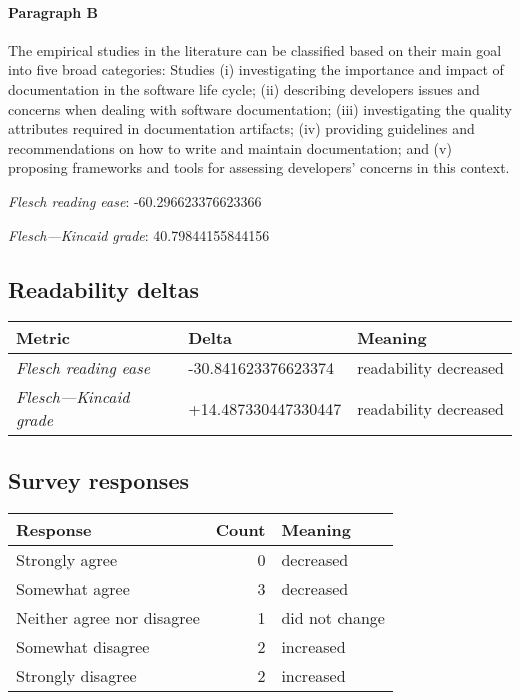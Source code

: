 \paragraph{Paragraph B}
The empirical studies in the literature can be classified based on their main goal into five broad categories: Studies (i) investigating the importance and impact of documentation in the software life cycle; (ii) describing developers issues and concerns when dealing with software documentation; (iii) investigating the quality attributes required in documentation artifacts; (iv) providing guidelines and recommendations on how to write and maintain documentation; and (v) proposing frameworks and tools for assessing developers' concerns in this context.\par\medskip\emph{Flesch reading ease}: -60.296623376623366\par\emph{Flesch---Kincaid grade}: 40.79844155844156

\subsection{Readability deltas}

\begin{tabular}{lll}
\toprule
               \textbf{Metric} &       \textbf{Delta} &       \textbf{Meaning} \\
\midrule
    \emph{Flesch reading ease} &  -30.841623376623374 &  readability decreased \\
 \emph{Flesch---Kincaid grade} &  +14.487330447330447 &  readability decreased \\
\bottomrule
\end{tabular}

\subsection{Survey responses}
\begin{tabular}{lrl}
\toprule
          \textbf{Response} &  \textbf{Count} & \textbf{Meaning} \\
\midrule
             Strongly agree &               0 &        decreased \\
             Somewhat agree &               3 &        decreased \\
 Neither agree nor disagree &               1 &   did not change \\
          Somewhat disagree &               2 &        increased \\
          Strongly disagree &               2 &        increased \\
\bottomrule
\end{tabular}

